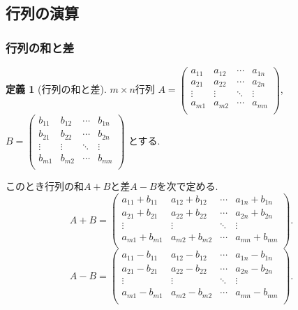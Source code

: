 \documentclass[dvipdfmx,a4paper,11pt]{article}
\theoremstyle{definition}
\newtheorem{dfn}[thm]{定義}
\begin{document}
\subsection{行列の演算 \cite[1.2節]{M}}
\subsubsection{行列の和と差}

 \begin{tcolorbox}[
    colback = white,
    colframe = green!35!black,
    fonttitle = \bfseries,
    breakable = true]
    \begin{dfn}[行列の和と差]
    \text{}
 
$m \times n$行列
$
A=\begin{pmatrix}
a_{11}& a_{12} & \cdots &a_{1n} \\
a_{21}& a_{22} & \cdots &a_{2n} \\
\vdots& \vdots	&	\ddots   &	\vdots \\
a_{m1}& a_{m2} & \cdots &a_{mn} \\
\end{pmatrix}
$, 
$
B=\begin{pmatrix}
b_{11}& b_{12} & \cdots &b_{1n} \\
b_{21}& b_{22} & \cdots &b_{2n} \\
\vdots& \vdots	&	\ddots   &	\vdots \\
b_{m1}& b_{m2} & \cdots &b_{mn} \\
\end{pmatrix}
$
とする.

このとき行列の和$A+B$と差$A-B$を次で定める.
$$
A+B=
\begin{pmatrix}
a_{11}+b_{11}& a_{12}+b_{12}& \cdots &a_{1n} +b_{1n}\\
a_{21}+b_{21}& a_{22}+b_{22}& \cdots &a_{2n}+b_{2n} \\
\vdots& \vdots	&	\ddots   &	\vdots \\
a_{m1}+b_{m1}& a_{m2} +b_{m2}& \cdots &a_{mn} +b_{mn}\\
\end{pmatrix}.
$$
$$
A-B=
\begin{pmatrix}
a_{11}-b_{11}& a_{12}-b_{12}& \cdots &a_{1n} -b_{1n}\\
a_{21}-b_{21}& a_{22}-b_{22}& \cdots &a_{2n}-b_{2n} \\
\vdots& \vdots	&	\ddots   &	\vdots \\
a_{m1}-b_{m1}& a_{m2}-b_{m2}& \cdots &a_{mn}-b_{mn}\\
\end{pmatrix}.
$$
  \end{dfn}
 \end{tcolorbox}
 
\end{document}
